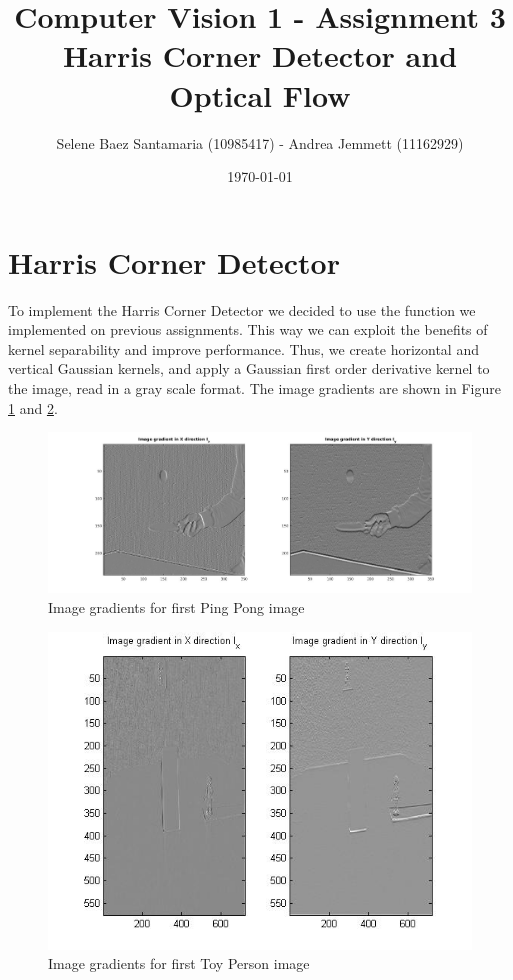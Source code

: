 \documentclass[11pt]{article}
\title{
	{Computer Vision 1 - Assignment 3 \\
	Harris Corner Detector and Optical Flow}
}
\author{
Selene Baez Santamaria (10985417) - Andrea Jemmett (11162929)}
\date{\today}
\begin{document}
\maketitle

\section{Harris Corner Detector}
To implement the Harris Corner Detector we decided to use the function we
implemented on previous assignments. This way we can exploit the benefits of
kernel separability and improve performance. Thus, we create horizontal and
vertical Gaussian kernels, and apply a Gaussian first order derivative kernel to
the image, read in a gray scale format. The image gradients are shown in Figure
\ref{fig:partialDerivatives_pingpong} and \ref{fig:partialDerivatives_person}.

\begin{figure}[H] \centering
	\includegraphics[width=1\textwidth]{imgs/derivatives_pingpong.jpg}
	\caption{Image gradients for first Ping Pong image}
	\label{fig:partialDerivatives_pingpong}
\end{figure}

\begin{figure}[H] \centering
	\includegraphics[width=1\textwidth]{imgs/derivatives_person.jpg}
	\caption{Image gradients for first Toy Person image}
	\label{fig:partialDerivatives_person}
\end{figure}
\end{document}
